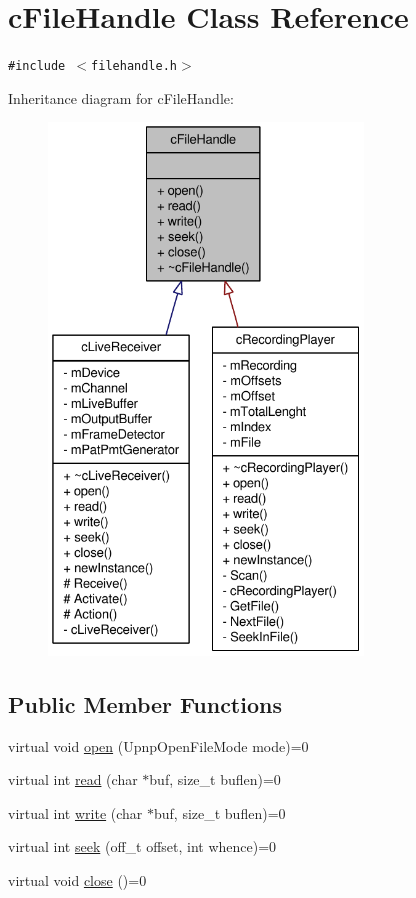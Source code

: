 \hypertarget{classcFileHandle}{
\section{cFileHandle Class Reference}
\label{classcFileHandle}
}
{\tt \#include $<$filehandle.h$>$}

Inheritance diagram for cFileHandle:\nopagebreak
\begin{figure}[H]
\begin{center}
\leavevmode
\includegraphics[height=400pt]{classcFileHandle__inherit__graph}
\end{center}
\end{figure}
\subsection*{Public Member Functions}
\begin{CompactItemize}
\item 
virtual void \hyperlink{classcFileHandle_cdf4f4d07382de675b498d85544ea1b6}{open} (UpnpOpenFileMode mode)=0
\item 
virtual int \hyperlink{classcFileHandle_458f25a4c7f62d528cffc84e66d38e7d}{read} (char $\ast$buf, size\_\-t buflen)=0
\item 
virtual int \hyperlink{classcFileHandle_e1495303f52f6f2d7ac37a030f78a937}{write} (char $\ast$buf, size\_\-t buflen)=0
\item 
virtual int \hyperlink{classcFileHandle_d2dde523301abe5e79e6109a93ba705b}{seek} (off\_\-t offset, int whence)=0
\item 
virtual void \hyperlink{classcFileHandle_d7eaed7d254a64c85a48c3968238b93d}{close} ()=0
\end{CompactItemize}


